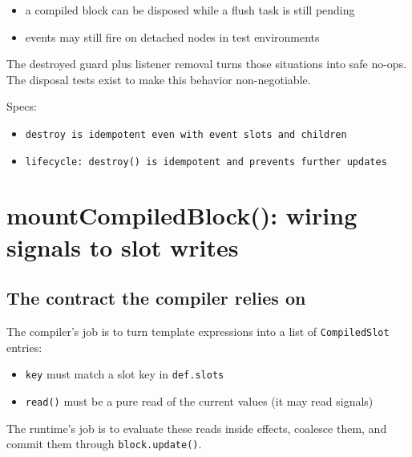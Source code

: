 \begin{itemize}
  \item a compiled block can be disposed while a flush task is still pending
  \item events may still fire on detached nodes in test environments
\end{itemize}

The destroyed guard plus listener removal turns those situations into safe no-ops.
The disposal tests exist to make this behavior non-negotiable.

Specs:

\begin{itemize}
  \item \texttt{destroy is idempotent even with event slots and children}
  \item \texttt{lifecycle: destroy() is idempotent and prevents further updates}
\end{itemize}

\section{mountCompiledBlock(): wiring signals to slot writes}

\subsection{The contract the compiler relies on}

The compiler's job is to turn template expressions into a list of \texttt{CompiledSlot} entries:

\begin{itemize}
  \item \texttt{key} must match a slot key in \texttt{def.slots}
  \item \texttt{read()} must be a pure read of the current values (it may read signals)
\end{itemize}

The runtime's job is to evaluate these reads inside effects, coalesce them, and commit them through \texttt{block.update()}.

\begin{center}
\end{center}

